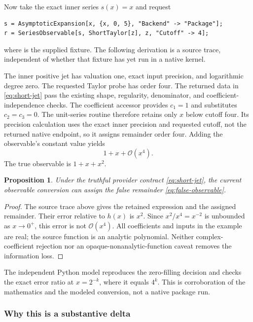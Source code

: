 \documentclass[11pt,letterpaper]{article}
\newcommand{\code}[1]{\texttt{\detokenize{#1}}}
\newcommand{\OO}{\mathcal O}
\newtheorem{proposition}{Proposition}
\begin{document}
Now take the exact inner series $s(x)=x$ and request
\begin{lstlisting}
s = AsymptoticExpansion[x, {x, 0, 5}, "Backend" -> "Package"];
r = SeriesObservable[s, ShortTaylor[z], z, "Cutoff" -> 4];
\end{lstlisting}
where \code{ShortTaylor} is the supplied fixture. The following derivation is a source trace, independent of whether that fixture has yet run in a native kernel.

The inner positive jet has valuation one, exact input precision, and logarithmic degree zero. The requested Taylor probe has order four. The returned data in \eqref{eq:short-jet} pass the existing shape, regularity, denominator, and coefficient-independence checks. The coefficient accessor provides $c_1=1$ and substitutes $c_2=c_3=0$. The unit-series routine therefore retains only $x$ below cutoff four. Its precision calculation uses the exact inner precision and requested cutoff, not the returned native endpoint, so it assigns remainder order four. Adding the observable's constant value yields
\begin{equation}\label{eq:false-observable}
 1+x+\OO(x^4).
\end{equation}
The true observable is $1+x+x^2$.

\begin{proposition}
Under the truthful provider contract \eqref{eq:short-jet}, the current observable conversion can assign the false remainder \eqref{eq:false-observable}.
\end{proposition}
\begin{proof}
The source trace above gives the retained expression and the assigned remainder. Their error relative to $h(x)$ is $x^2$. Since $x^2/x^4=x^{-2}$ is unbounded as $x\to0^+$, this error is not $\OO(x^4)$. All coefficients and inputs in the example are real; the source function is an analytic polynomial. Neither complex-coefficient rejection nor an opaque-nonanalytic-function caveat removes the information loss.
\end{proof}

The independent Python model reproduces the zero-filling decision and checks the exact error ratio at $x=2^{-k}$, where it equals $4^k$. This is corroboration of the mathematics and the modeled conversion, not a native package run.

\subsubsection*{Why this is a substantive delta}
\end{document}
